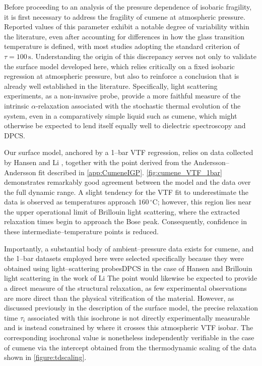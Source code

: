 Before proceeding to an analysis of the pressure dependence of isobaric fragility, it is first necessary to address the fragility of cumene at atmospheric pressure. Reported values of this parameter exhibit a notable degree of variability within the literature, even after accounting for differences in how the glass transition temperature is defined, with most studies adopting the standard criterion of $\tau = 100\,\si{\second}$. Understanding the origin of this discrepancy serves not only to validate the surface model developed here, which relies critically on a fixed isobaric regression at atmospheric pressure, but also to reinforce a conclusion that is already well established in the literature. Specifically, light scattering experiments, as a non-invasive probe, provide a more faithful measure of the intrinsic $\alpha$-relaxation associated with the stochastic thermal evolution of the system, even in a comparatively simple liquid such as cumene, which might otherwise be expected to lend itself equally well to dielectric spectroscopy and DPCS.

Our surface model, anchored by a 1--bar VTF regression, relies on data collected by Hansen \etal \cite{Hansen2018} and Li \etal \cite{Li1995CumenePRL}, together with the \tgp point derived from the Andersson--Andersson fit described in \app\ref{app:CumeneIGP}. \fig  \ref{fig:cumene_VTF_1bar} demonstrates remarkably good agreement between the model and the data over the full dynamic range. A slight tendency for the VTF fit to underestimate the data is observed as temperatures approach $160\,^{\circ}\mathrm{C}$; however, this region lies near the upper operational limit of Brillouin light scattering, where the extracted relaxation times begin to approach the Bose peak. Consequently, confidence in these intermediate--temperature points is reduced.

Importantly, a substantial body of ambient--pressure data exists for cumene, and the 1--bar datasets employed here were selected specifically because they were obtained using light--scattering probes\textemdash DPCS in the case of Hansen \etal and Brillouin light scattering in the work of Li \etal The \tgp point would likewise be expected to provide a direct measure of the structural relaxation, as few experimental observations are more direct than the physical vitrification of the material. However, as discussed previously in the description of the surface model, the precise relaxation time $\tau_i$ associated with this isochrone is not directly experimentally measurable and is instead constrained by where it crosses this atmospheric VTF isobar. The corresponding isochronal value is nonetheless independently verifiable in the case of cumene via the intercept obtained from the thermodynamic scaling of the data shown in \fig \ref{figure:tdscaling}.

